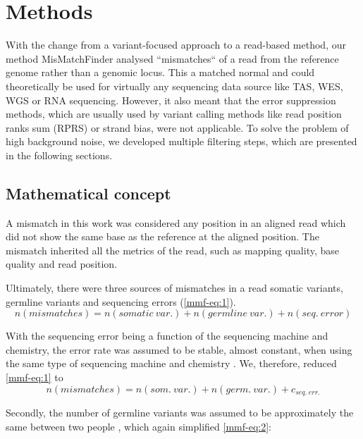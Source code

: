 \section{Methods}
\label{mmf-sec:methods}

With the change from a variant-focused approach to a read-based method, our method  MisMatchFinder analysed ``mismatches`` of a read from the reference genome rather than a genomic locus. This  a matched normal and could theoretically be used for virtually any sequencing data source like TAS, WES, WGS or  RNA sequencing. However, it also meant that the error suppression methods, which are usually used by variant calling methods like read position ranks sum (RPRS) or strand bias, were not applicable. To solve the problem of high background noise, we developed multiple filtering steps, which are presented in the following sections.

\subsection{Mathematical concept}
\label{mmf-sec:concept}
A mismatch in this work was considered  any position in an aligned read which did not show the same base as the reference at the aligned position. The mismatch inherited all the metrics of the read, such as mapping quality, base quality and read position. 

Ultimately, there were three sources of mismatches in a read somatic variants, germline variants and sequencing errors (\autoref{mmf-eq:1}).
\begin{equation}
n(mismatches) = n(somatic~var.) + n(germline~var.)  + n(seq.~ error)
\label{mmf-eq:1}
\end{equation}
\myequation[\ref{mmf-eq:1}]{MisMatchFinder: number of mismatches}

With the sequencing error being a function of the sequencing machine and chemistry, the error rate was assumed to be stable, almost constant, when using the same type of sequencing machine and chemistry \cite{Schirmer2016,Stoler2021}. We, therefore, reduced \autoref{mmf-eq:1} to
\begin{equation}
n(mismatches) = n(som.~var.) + n(germ.~var.)  + c_{seq.~err.}
\label{mmf-eq:2}
\end{equation}
\myequation[\ref{mmf-eq:2}]{MisMatchFinder: sequencing error}

Secondly, the number of germline variants was assumed to be approximately the same between two people \cite{Auton2015}, which again simplified \autoref{mmf-eq:2}:

